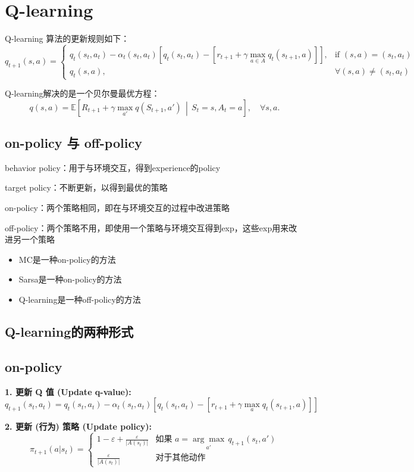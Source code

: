 \documentclass{article}
\begin{document}
\section{Q-learning}
Q-learning 算法的更新规则如下：
\[
q_{t+1}(s, a) =
\begin{cases}
    q_t(s_t, a_t) - \alpha_t(s_t, a_t) \left[ q_t(s_t, a_t) - [r_{t+1} + \gamma \max_{a \in A} q_t(s_{t+1}, a)] \right], & \text{if } (s,a) = (s_t, a_t) \\
    q_t(s, a), & \forall (s, a) \neq (s_t, a_t)
\end{cases}
\]

Q-learning解决的是一个贝尔曼最优方程：
$$
q(s, a) = \mathbb{E} \left[ R_{t+1} + \gamma \max_{a'} q(S_{t+1}, a') \, \middle| \, S_t = s, A_t = a \right], \quad \forall s, a.
$$
\subsection*{on-policy 与 off-policy}
behavior policy：用于与环境交互，得到experience的policy

target policy：不断更新，以得到最优的策略

on-policy：两个策略相同，即在与环境交互的过程中改进策略

off-policy：两个策略不用，即使用一个策略与环境交互得到exp，这些exp用来改进另一个策略
\begin{itemize}
    \item MC是一种on-policy的方法
    \item Sarsa是一种on-policy的方法
    \item Q-learning是一种off-policy的方法
\end{itemize}
\subsection{Q-learning的两种形式}
\subsection*{on-policy}
\textbf{1. 更新 Q 值 (Update q-value):}
\[
q_{t+1}(s_t, a_t) = q_t(s_t, a_t) - \alpha_t(s_t, a_t) \left[ q_t(s_t, a_t) - [r_{t+1} + \gamma \max_{a} q_t(s_{t+1}, a)] \right]
\]

\textbf{2. 更新 (行为) 策略 (Update policy):}
\[
\pi_{t+1}(a|s_t) =
\begin{cases}
    1 - \varepsilon + \frac{\varepsilon}{|A(s_t)|} & \text{如果 } a = \underset{a'}{\arg\max} \, q_{t+1}(s_t, a') \\
    \frac{\varepsilon}{|A(s_t)|} & \text{对于其他动作}
\end{cases}
\]
\end{document}
